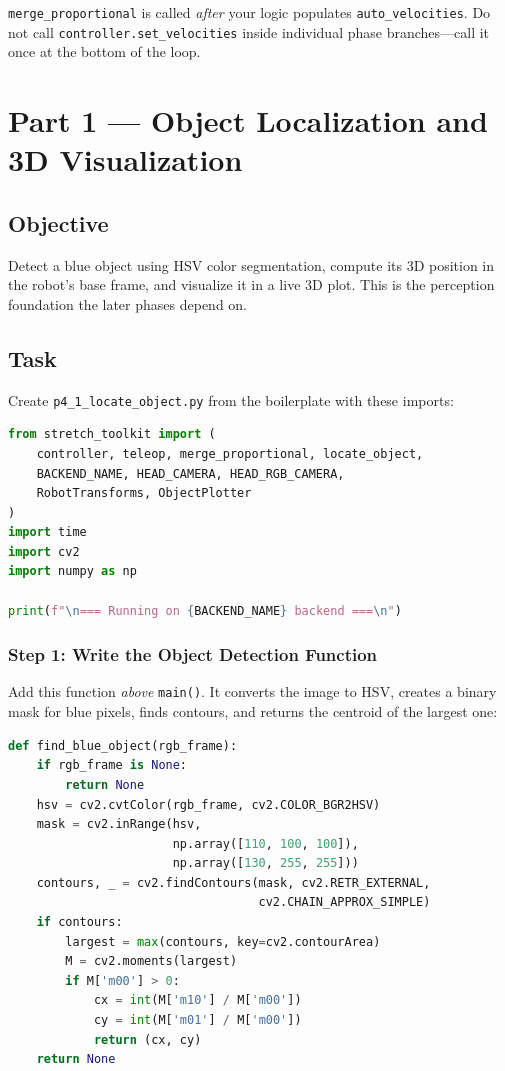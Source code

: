 \documentclass[11pt,a4paper]{article}
\begin{document}
\begin{notebox}
\texttt{merge\_proportional} is called \emph{after} your logic populates \texttt{auto\_velocities}. Do not call \texttt{controller.set\_velocities} inside individual phase branches---call it once at the bottom of the loop.
\end{notebox}

\newpage

\section*{Part 1 --- Object Localization and 3D Visualization}

\subsection*{Objective}

Detect a blue object using HSV color segmentation, compute its 3D position in the robot's base frame, and visualize it in a live 3D plot. This is the perception foundation the later phases depend on.

\subsection*{Task}

Create \texttt{p4\_1\_locate\_object.py} from the boilerplate with these imports:

\begin{lstlisting}[language=Python]
from stretch_toolkit import (
    controller, teleop, merge_proportional, locate_object,
    BACKEND_NAME, HEAD_CAMERA, HEAD_RGB_CAMERA,
    RobotTransforms, ObjectPlotter
)
import time
import cv2
import numpy as np

print(f"\n=== Running on {BACKEND_NAME} backend ===\n")
\end{lstlisting}

\subsubsection*{Step 1: Write the Object Detection Function}

Add this function \emph{above} \texttt{main()}. It converts the image to HSV, creates a binary mask for blue pixels, finds contours, and returns the centroid of the largest one:

\begin{lstlisting}[language=Python]
def find_blue_object(rgb_frame):
    if rgb_frame is None:
        return None
    hsv = cv2.cvtColor(rgb_frame, cv2.COLOR_BGR2HSV)
    mask = cv2.inRange(hsv,
                       np.array([110, 100, 100]),
                       np.array([130, 255, 255]))
    contours, _ = cv2.findContours(mask, cv2.RETR_EXTERNAL,
                                   cv2.CHAIN_APPROX_SIMPLE)
    if contours:
        largest = max(contours, key=cv2.contourArea)
        M = cv2.moments(largest)
        if M['m00'] > 0:
            cx = int(M['m10'] / M['m00'])
            cy = int(M['m01'] / M['m00'])
            return (cx, cy)
    return None
\end{lstlisting}
\end{document}
